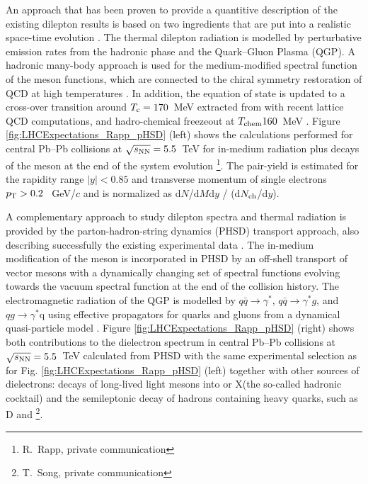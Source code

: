 \documentclass[../report.tex]{subfiles}
\begin{document}
An approach that has been proven to provide a quantitive description of the existing dilepton results \cite{Rapp:2011is} is based on two ingredients that are put into a realistic space-time evolution \cite{Rapp:2000pe}. The thermal dilepton radiation is modelled by perturbative emission rates from the hadronic phase and the Quark--Gluon Plasma (QGP)\cite{vanHees:2007th,Rapp:2009yu}. A hadronic many-body approach \cite{Rapp:1999us} is used for the medium-modified spectral function of the \Prho meson functions, which are connected to the chiral symmetry restoration of QCD at high temperatures \cite{Hohler:2013eba}. In addition, the equation of state is updated to a cross-over transition around $T_{\rm c}=170$~MeV extracted from with recent lattice QCD computations, and hadro-chemical freezeout at $T_{\rm chem}160$~MeV \cite{He:2011zx}. Figure \ref{fig:LHCExpectations_Rapp_pHSD} (left) shows the calculations performed for central Pb--Pb collisions at $\sqrt{s_{\rm NN}}= 5.5$~TeV for in-medium radiation plus decays of the \Prho meson at the end of the system evolution \footnote{R.~Rapp, private communication}. The pair-yield is estimated for the rapidity range $|y|<0.85$ and transverse momentum of single electrons $p_{\rm T}>0.2$~ GeV/$c$ and is normalized as d$N$/d$M$d$y$ / (d$N_{\rm ch}$/d$y$). 
 
A complementary approach to study dilepton spectra and thermal radiation is provided by the parton-hadron-string dynamics (PHSD) transport approach, also describing successfully the existing experimental data \cite{Linnyk:2015rco,Cassing:2009vt}. The in-medium modification of the \Prho meson is incorporated in PHSD by an off-shell transport of vector mesons with a dynamically changing set of spectral functions \cite{Bratkovskaya:2007jk} evolving towards the vacuum spectral function at the end of the collision history. The electromagnetic radiation of the QGP is modelled by $q\bar{q}\rightarrow\gamma^{*}$, $q\bar{q}\rightarrow\gamma^{*}g$, and $qg\rightarrow\gamma^{*}$q using effective propagators for quarks and gluons from a dynamical quasi-particle model \cite{Linnyk:2010vb}. Figure \ref{fig:LHCExpectations_Rapp_pHSD} (right) shows both contributions to the dielectron spectrum in central Pb--Pb collisions at $\sqrt{s_{\rm NN}}= 5.5$~TeV calculated from PHSD with the same experimental selection as for Fig. \ref{fig:LHCExpectations_Rapp_pHSD} (left) together with other sources of dielectrons: decays of long-lived light mesons into \Pepem or X\Pepem (the so-called hadronic cocktail) and the semileptonic decay of hadrons containing heavy quarks, such as D and \footnote{T.~Song, private communication}. 
\end{document}

